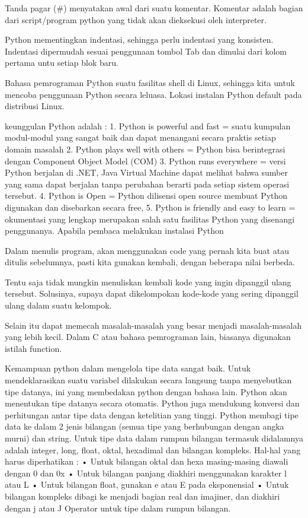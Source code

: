 Tanda pagar (#) menyatakan awal dari suatu komentar. Komentar adalah bagian dari
script/program python yang tidak akan dieksekusi oleh interpreter. 


Python mementingkan indentasi, sehingga perlu indentasi yang konsisten. Indentasi dipermudah sesuai penggunaan
tombol Tab dan dimulai dari kolom pertama untu setiap blok baru. 

Bahasa pemrograman Python suatu fasilitas  shell di Linux, sehingga kita untuk mencoba penggunaan
Python secara leluasa. Lokasi instalan Python default pada distribusi Linux.

keunggulan Python adalah :
1. Python is powerful and fast = suatu kumpulan modul-modul yang sangat baik dan dapat menangani secara praktis setiap domain masalah
2. Python plays well with others = Python bisa berintegrasi dengan Component Object Model (COM) 
3. Python runs everywhere = versi Python berjalan di .NET, Java Virtual Machine dapat melihat bahwa sumber yang sama dapat berjalan tanpa perubahan berarti pada setiap sistem operasi tersebut.
4. Python is Open = Python dilisensi open source membuat Python digunakan dan disebarkan secara free,
5. Python is friendly and easy to learn = okumentasi yang lengkap merupakan salah satu fasilitas Python yang disenangi penggunanya. Apabila pembaca melakukan instalasi Python

Dalam menulis program, akan menggunakan code yang pernah kita  buat atau ditulis sebelumnya, pasti
kita gunakan kembali, dengan beberapa nilai berbeda.
 
Tentu saja tidak mungkin menuliskan kembali kode yang ingin dipanggil ulang tersebut.
Solusinya, supaya dapat dikelompokan kode-kode yang sering dipanggil ulang dalam suatu kelompok.

Selain itu dapat memecah masalah-masalah yang besar  menjadi masalah-masalah yang lebih kecil.
Dalam C atau bahasa pemrograman lain, biasanya digunakan istilah function.

Kemampuan python dalam mengelola tipe data sangat baik. Untuk mendeklarasikan suatu variabel dilakukan secara langsung tanpa menyebutkan tipe datanya, ini yang membedakan python dengan bahasa lain. Python akan menentukan tipe datanya secara otomatis. Python juga mendukung konversi dan perhitungan antar tipe data dengan ketelitian yang tinggi. Python membagi tipe data ke dalam 2 jenis bilangan (semua tipe yang berhubungan dengan angka murni) dan string. Untuk tipe data dalam rumpun bilangan termasuk didalamnya adalah integer, long, float, oktal, hexadimal dan bilangan kompleks. Hal-hal yang harus diperhatikan :
•	Untuk bilangan oktal dan hexa masing-masing diawali dengan 0 dan 0x
•	Untuk bilangan panjang diakhiri menggunakan karakter l atau L
•	Untuk bilangan float, gunakan e atau E pada eksponensial
•	Untuk bilangan kompleks dibagi ke menjadi bagian real dan imajiner, dan diakhiri dengan j atau J Operator untuk tipe dalam rumpun bilangan.\cite{utamipemrograman}

